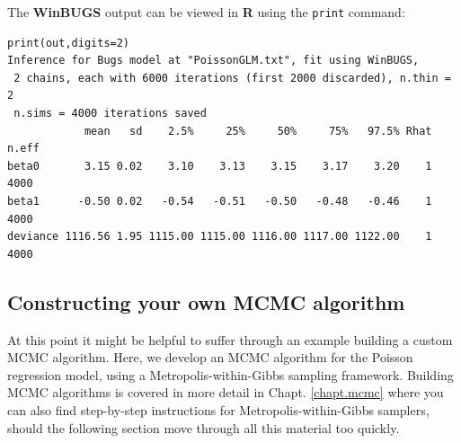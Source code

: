 {\flushleft The} {\bf WinBUGS} output can be viewed in {\bf R} using the {\tt print} command:
{\small
\begin{verbatim}
print(out,digits=2)
Inference for Bugs model at "PoissonGLM.txt", fit using WinBUGS,
 2 chains, each with 6000 iterations (first 2000 discarded), n.thin = 2
 n.sims = 4000 iterations saved
            mean   sd    2.5%     25%     50%     75%   97.5% Rhat n.eff
beta0       3.15 0.02    3.10    3.13    3.15    3.17    3.20    1  4000
beta1      -0.50 0.02   -0.54   -0.51   -0.50   -0.48   -0.46    1  4000
deviance 1116.56 1.95 1115.00 1115.00 1116.00 1117.00 1122.00    1  4000
\end{verbatim}
}




\subsection{ Constructing your own MCMC algorithm}
\label{GLMM.sect.mcmc}

At this point it might be helpful to suffer through an example
building a custom MCMC algorithm. Here, we develop an MCMC algorithm
for the Poisson regression model, using a Metropolis-within-Gibbs
sampling framework.  Building MCMC algorithms is covered in more
detail in Chapt. \ref{chapt.mcmc} where you can also find step-by-step
instructions for Metropolis-within-Gibbs samplers, should the
following section move through all this material too quickly.


